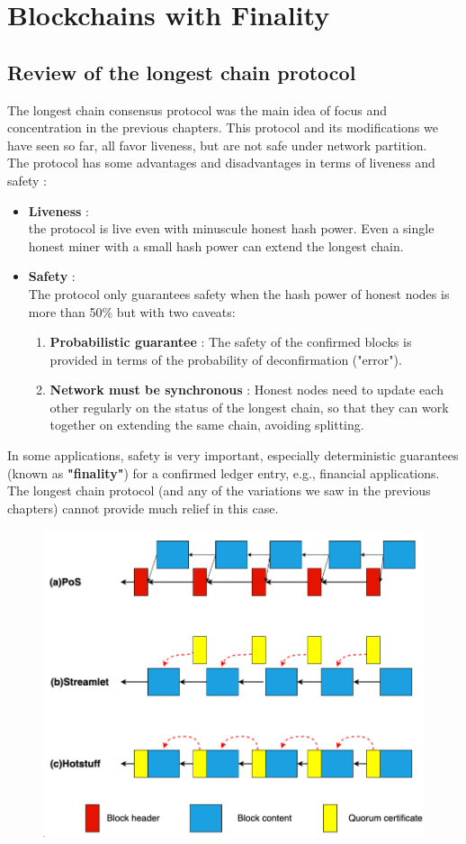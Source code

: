 \chapter{Blockchains with Finality}
\section{Review of the longest chain protocol}
The longest chain consensus protocol was the main idea of focus and concentration in the previous chapters. This protocol and its modifications we have seen so far, all favor liveness, but are not safe under network partition.\\
The protocol has some advantages and disadvantages in terms of liveness and safety :
\begin{itemize}
	\item \textbf{Liveness} : \\
	the protocol is live even with minuscule honest hash power. Even a single honest miner with a small hash power can extend the longest chain.
	\item \textbf{Safety} : \\
	The protocol only guarantees safety when the hash power of honest nodes is more than 50\% but with two caveats:
	\begin{enumerate}
		\item \textbf{Probabilistic guarantee} :
		The safety of the confirmed blocks is provided in terms of the probability of deconfirmation ("error").
		\item \textbf{Network must be synchronous} :
		Honest nodes need to update each other regularly on the status of the longest chain, so that they can work together on extending the same chain, avoiding splitting.
	\end{enumerate}
\end{itemize}
In some applications, safety is very important, especially deterministic guarantees (known as \textbf{"finality"}) for a confirmed ledger entry, e.g., financial applications. The longest chain protocol (and any of the variations we saw in the previous chapters) cannot provide much relief in this case.
\begin{figure}[h!]
	\centering
	\includegraphics[width=0.5\linewidth]{Fig/15/F8}
	\caption{}
	\label{fig:L15_f8}
\end{figure}


